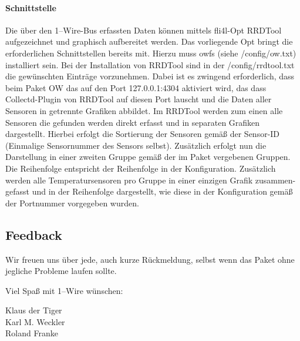 \paragraph{Schnittstelle}
Die über den 1--Wire-Bus erfassten Daten können mittels fli4l-Opt \glqq{}RRDTool\grqq{} aufgezeichnet
und graphisch aufbereitet werden. Das vorliegende Opt bringt die erforderlichen
Schnittstellen bereits mit. Hierzu muss owfs (siehe /config/ow.txt) installiert
sein. Bei der Installation von RRDTool sind in der /config/rrdtool.txt die gewünschten
Einträge vorzunehmen. Dabei ist es zwingend erforderlich, dass beim Paket OW das
 auf den Port 127.0.0.1:4304 aktiviert wird, das dass Collectd-Plugin von
RRDTool auf diesen Port lauscht und die Daten aller Sensoren in getrennte Grafiken
abbildet.
Im RRDTool werden zum einen alle Sensoren die gefunden werden direkt erfasst und in 
separaten Grafiken dargestellt. Hierbei erfolgt die Sortierung der Sensoren gemäß der
Sensor-ID (Einmalige Sensornummer des Sensors selbst).
Zusätzlich erfolgt nun die Darstellung in einer zweiten Gruppe gemäß der im Paket
vergebenen Gruppen. Die Reihenfolge entspricht der Reihenfolge in der Konfiguration.
Zusätzlich werden alle Temperatursensoren pro Gruppe in einer einzigen Grafik zusammen-
gefasst und in der Reihenfolge dargestellt, wie diese in der Konfiguration gemäß
der Portnummer vorgegeben wurden.

\subsection{Feedback}
Wir freuen uns über jede, auch kurze Rückmeldung, selbst wenn das Paket ohne
jegliche Probleme laufen sollte.

Viel Spaß mit 1--Wire wünschen:

Klaus der Tiger \\
Karl M. Weckler \\
Roland Franke 
